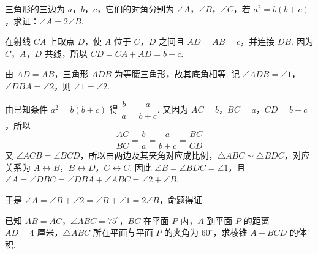 \begin{problem}
三角形的三边为 \(a\)，\(b\)，\(c\)，它们的对角分别为 \(\angle A\)，\(\angle B\)，\(\angle C\)，若 \(a^2=b \left( b+c \right)\)，求证：\(\angle A=2\angle B\).
\end{problem}

\begin{solution}
在射线 \(CA\) 上取点 \(D\)，使 \(A\) 位于 \(C\)，\(D\) 之间且 \(AD=AB=c\)，并连接 \(DB\). 因为 \(C\)，\(A\)，\(D\) 共线，所以 \(CD=CA+AD=b+c\).

由 \(AD=AB\)，三角形 \(ADB\) 为等腰三角形，故其底角相等. 记 \(\angle ADB=\angle1\)，\(\angle DBA=\angle2\)，则 \(\angle1=\angle2\).

由已知条件 \(a^2=b(b+c)\) 得 \(\dfrac{b}{a}=\dfrac{a}{b+c}\). 又因为 \(AC=b\)，\(BC=a\)，\(CD=b+c\)，所以
\[
\frac{AC}{BC}=\frac{b}{a}=\frac{a}{b+c}=\frac{BC}{CD}
\]
又 \(\angle ACB=\angle BCD\)，所以由两边及其夹角对应成比例，\(\triangle ABC\sim\triangle BDC\)，对应关系为 \(A\leftrightarrow B\)，\(B\leftrightarrow D\)，\(C\leftrightarrow C\). 因此 \(\angle B=\angle BDC=\angle1\)，且
\(\angle A=\angle DBC=\angle DBA+\angle ABC=\angle2+\angle B\).

于是 \(\angle A=\angle B+\angle2=\angle B+\angle1=2\angle B\)，命题得证.
\end{solution}

\begin{problem}
已知 \(AB=AC\)，\(\angle ABC=75^\circ\)，\(BC\) 在平面 \(P\) 内，\(A\) 到平面 \(P\) 的距离 \(AD=4\text{ 厘米}\)，\(\triangle ABC\) 所在平面与平面 \(P\) 的夹角为 \(60^\circ\)，求棱锥 \(A-BCD\) 的体积.
\end{problem}

